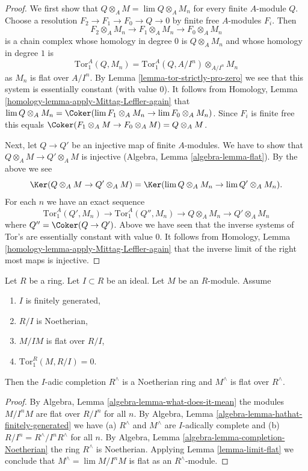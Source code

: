 \begin{proof}
We first show that $Q \otimes_A M = \lim Q \otimes_A M_n$ for every finite
$A$-module $Q$. Choose a resolution $F_2 \to F_1 \to F_0 \to Q \to 0$
by finite free $A$-modules $F_i$. Then
$$
F_2 \otimes_A M_n \to F_1 \otimes_A M_n \to F_0 \otimes_A M_n
$$
is a chain complex whose homology in degree $0$ is $Q \otimes_A M_n$
and whose homology in degree $1$ is
$$
\text{Tor}_1^A(Q, M_n) = \text{Tor}_1^A(Q, A/I^n) \otimes_{A/I^n} M_n
$$
as $M_n$ is flat over $A/I^n$. By Lemma \ref{lemma-tor-strictly-pro-zero}
we see that this system is essentially constant (with value $0$).
It follows from Homology, Lemma \ref{homology-lemma-apply-Mittag-Leffler-again}
that $\lim Q \otimes_A M_n =
\Coker(\lim F_1 \otimes_A M_n \to \lim F_0 \otimes_A M_n)$.
Since $F_i$ is finite free this equals
$\Coker(F_1 \otimes_A M \to F_0 \otimes_A M) = Q \otimes_A M$.

\medskip\noindent
Next, let $Q \to Q'$ be an injective map of finite $A$-modules.
We have to show that $Q \otimes_A M \to Q' \otimes_A M$ is injective
(Algebra, Lemma \ref{algebra-lemma-flat}). By the above we see
$$
\Ker(Q \otimes_A M \to Q' \otimes_A M) =
\Ker(\lim Q \otimes_A M_n \to \lim Q' \otimes_A M_n).
$$
For each $n$ we have an exact sequence
$$
\text{Tor}_1^A(Q', M_n) \to \text{Tor}_1^A(Q'', M_n) \to
Q \otimes_A M_n \to Q' \otimes_A M_n
$$
where $Q'' = \Coker(Q \to Q')$. Above we have seen that the
inverse systems of Tor's are essentially constant with value $0$.
It follows from
Homology, Lemma \ref{homology-lemma-apply-Mittag-Leffler-again}
that the inverse limit of the right most maps is injective.
\end{proof}

\begin{lemma}
\label{lemma-flat-after-completion}
Let $R$ be a ring. Let $I \subset R$ be an ideal. Let $M$ be
an $R$-module. Assume
\begin{enumerate}
\item $I$ is finitely generated,
\item $R/I$ is Noetherian,
\item $M/IM$ is flat over $R/I$,
\item $\text{Tor}_1^R(M, R/I) = 0$.
\end{enumerate}
Then the $I$-adic completion $R^\wedge$
is a Noetherian ring and $M^\wedge$ is flat over $R^\wedge$.
\end{lemma}

\begin{proof}
By Algebra, Lemma \ref{algebra-lemma-what-does-it-mean}
the modules $M/I^nM$ are flat over $R/I^n$ for all $n$.
By Algebra, Lemma \ref{algebra-lemma-hathat-finitely-generated} we have
(a) $R^\wedge$ and $M^\wedge$ are $I$-adically complete and
(b) $R/I^n = R^\wedge/I^nR^\wedge$ for all $n$.
By Algebra, Lemma \ref{algebra-lemma-completion-Noetherian}
the ring $R^\wedge$ is Noetherian.
Applying Lemma \ref{lemma-limit-flat} we conclude that
$M^\wedge = \lim M/I^nM$ is flat as an $R^\wedge$-module.
\end{proof}








